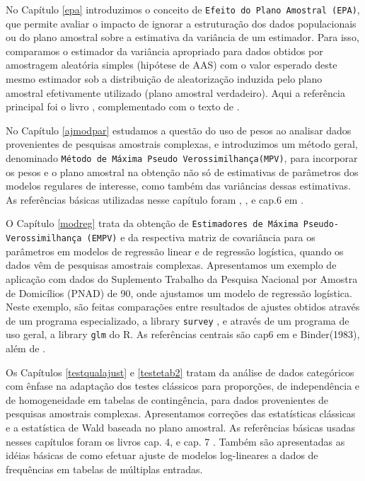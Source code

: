 \documentclass[]{book}
\theoremstyle{definition}
\theoremstyle{definition}
\theoremstyle{definition}
\theoremstyle{remark}
\begin{document}
No Capítulo \ref{epa} introduzimos o conceito de
\texttt{Efeito\ do\ Plano\ Amostral\ (EPA)}, que permite avaliar o
impacto de ignorar a estruturação dos dados populacionais ou do plano
amostral sobre a estimativa da variância de um estimador. Para isso,
comparamos o estimador da variância apropriado para dados obtidos por
amostragem aleatória simples (hipótese de AAS) com o valor esperado
deste mesmo estimador sob a distribuição de aleatorização induzida pelo
plano amostral efetivamente utilizado (plano amostral verdadeiro). Aqui
a referência principal foi o livro \citep{SHS89}, complementado com o
texto de \citep{lethonen}.

No Capítulo \ref{ajmodpar} estudamos a questão do uso de pesos ao
analisar dados provenientes de pesquisas amostrais complexas, e
introduzimos um método geral, denominado
\texttt{Método\ de\ Máxima\ Pseudo\ Verossimilhança(MPV)}, para
incorporar os pesos e o plano amostral na obtenção não só de estimativas
de parâmetros dos modelos regulares de interesse, como também das
variâncias dessas estimativas. As referências básicas utilizadas nesse
capítulo foram \citep{SHS89}, \citep{Pfeff}, \citep{binder83} e cap.6 em
\citep{Silva}.

O Capítulo \ref{modreg} trata da obtenção de
\texttt{Estimadores\ de\ Máxima\ Pseudo-Verossimilhança\ (EMPV)} e da
respectiva matriz de covariância para os parâmetros em modelos de
regressão linear e de regressão logística, quando os dados vêm de
pesquisas amostrais complexas. Apresentamos um exemplo de aplicação com
dados do Suplemento Trabalho da Pesquisa Nacional por Amostra de
Domicílios (PNAD) de 90, onde ajustamos um modelo de regressão
logística. Neste exemplo, são feitas comparações entre resultados de
ajustes obtidos através de um programa especializado, a library
\texttt{survey} \citep{R-survey}, e através de um programa de uso geral,
a library \texttt{glm} do R. As referências centrais são cap6 em
\citep{Silva} e Binder(1983), além de \citep{Pessoa}.

Os Capítulos \ref{testqualajust} e \ref{testetab2} tratam da análise de
dados categóricos com ênfase na adaptação dos testes clássicos para
proporções, de independência e de homogeneidade em tabelas de
contingência, para dados provenientes de pesquisas amostrais complexas.
Apresentamos correções das estatísticas clássicas e a estatística de
Wald baseada no plano amostral. As referências básicas usadas nesses
capítulos foram os livros cap. 4, \citep{SHS89} e cap. 7
\citep{lethonen}. Também são apresentadas as idéias básicas de como
efetuar ajuste de modelos log-lineares a dados de frequências em tabelas
de múltiplas entradas.
\end{document}
